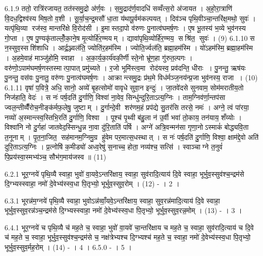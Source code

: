 6.1.9
ततो॒ रात्रि॑रजायत॒ तत॑स्समु॒द्रो अ॑र्ण॒वः । स॒मु॒द्राद॑र्ण॒वादधि॑ सव्वँत्स॒रो अ॑जायत । अ॒हो॒रा॒त्राणि॑ वि॒दध॒द्विश्व॑स्य मिष॒तो व॒शी । सू॒र्या॒च॒न्द्र॒मसौ॑ धा॒ता य॑थापू॒र्वम॑कल्पयत् । दिव॑ञ्च पृथि॒वीञ्चा॒न्तरि॑क्ष॒मथो॒ सुवः॑ । यत्पृ॑थि॒व्या रज॑स्व॒ मान्तरि॑क्षे वि॒रोद॑सी । इ॒मास्तदा॒पो व॑रुणः पु॒नात्व॑घमर्\mbox{}ष॒णः । ए॒ष भू॒तस्य॑ भ॒व्ये भुव॑नस्य गो॒प्ता । ए॒ष पु॒ण्यकृ॑ताल्लोँ॒का॒ने॒ष मृ॒त्योर्\mbox{}हि॑र॒ण्मयम् । द्यावा॑पृथि॒व्योर्\mbox{}हि॑र॒ण्मय॒ सश्रि॑त॒ सुवः॑ । (9)
6.1.10
स न॒स्सुव॒स्सशि॑शाधि । आर्द्र॒ञ्ज्वल॑ति॒ ज्योति॑र॒हम॑स्मि । ज्योति॒र्ज्वल॑ति॒ ब्रह्मा॒हम॑स्मि । यो॑ऽहम॑स्मि॒ ब्रह्मा॒हम॑स्मि । अ॒हमे॒वाहं माञ्जु॑होमि॒ स्वाहा । अ॒का॒र्य॒का॒र्य॑वकी॒र्णी स्ते॒नो भ्रू॑ण॒हा गु॑रुत॒ल्पगः । वरु॑णो॒ऽपाम॑घमर्\mbox{}ष॒णस्तस्मात्पा॒पात् प्रमु॑च्यते । र॒जो भूमि॑स्त्व॒मा रोद॑यस्व॒ प्रव॑दन्ति॒ धीराः । पु॒नन्तु॒ ऋष॑यः पु॒नन्तु॒ वस॑वः पु॒नातु॒ वरु॑णः पु॒नात्व॑घमर्\mbox{}ष॒णः । आक्रान्त्समु॒द्रः प्र॑थ॒मे विध॑र्मञ्ज॒नय॑न्प्र॒जा भुव॑नस्य॒ राजा । (10)
6.1.11
वृषा॑ प॒वित्रे॒ अधि॒ सानो॒ अव्ये॑ बृ॒हत्सोमो॑ वावृधे सुवा॒न इन्दुः॑ । जा॒तवे॑दसे सुनवाम॒ सोम॑मरातीय॒तो निज॑हाति॒ वेदः॑ । स नः॑ पर्\mbox{}ष॒दति॑ दु॒र्गाणि॒ विश्वा॑ ना॒वेव॒ सिन्धु॑न्दुरि॒ताऽत्य॒ग्निः । ताम॒ग्निव॑र्णा॒न्तप॑सा ज्वल॒न्तीव्वैँ॑रोच॒नीङ्क॑र्मफ॒लेषु॒ जुष्टाम् । दु॒र्गान्दे॒वी शर॑णम॒हं प्रप॑द्ये सु॒तर॑सि तरसे॒ नमः॑ । अग्ने॒ त्वं पा॑रया॒ नव्यो॑ अ॒स्मान्त्स्व॒स्तिभि॒रति॑ दु॒र्गाणि॒ विश्वा । पूश्च॑ पृ॒थ्वी ब॑हु॒ला न॑ उ॒र्वी भवा॑ तो॒काय॒ तन॑याय॒ शँय्योः । विश्वा॑नि नो दु॒र्गहा॑ जातवेद॒स्सिन्धु॒न्न ना॒वा दु॑रि॒ताति॑ पर्\mbox{}षि । अग्ने॑ अत्रि॒वन्मन॑सा गृणा॒नोऽस्माकं॑ बोद्ध्यवि॒ता त॒नूनाम् । पृ॒त॒ना॒जित॒ सह॑मानम॒ग्निमु॒ग्र हु॑वेम पर॒मात्स॒धस्थात् । स नः॑ पर्\mbox{}ष॒दति॑ दु॒र्गाणि॒ विश्वा॒ क्षाम॑द्दे॒वो अति॑ दुरि॒ताऽत्य॒ग्निः । प्र॒त्नोषि॑ क॒मीड्यो॑ अध्व॒रेषु॑ स॒नाच्च॒ होता॒ नव्य॑श्च॒ सत्सि॑ । स्वाञ्चाग्ने त॒नुवं॑ पि॒प्रय॑स्वा॒स्मभ्य॑ञ्च॒ सौभ॑ग॒माय॑जस्व ॥ (11)
\anuvakamend


6.2.1
भूर॒ग्नये॑ पृथि॒व्यै स्वाहा॒ भुवो॑ वा॒यवे॒ऽन्तरि॑क्षाय॒ स्वाहा॒ सुव॑रादि॒त्याय॑ दि॒वे स्वाहा॒ भूर्भुव॒स्सुव॑श्च॒न्द्रम॑से दि॒ग्भ्यस्स्वाहा॒ नमो॑ दे॒वेभ्य॑स्स्व॒धा पि॒तृभ्यो॒ भूर्भुव॒स्सुव॒रोम् । (12) - । 2 ।
\anuvakamend

6.3.1
भूरन्न॑म॒ग्नये॑ पृथि॒व्यै स्वाहा॒ भुवोऽन्न॑व्वाँ॒यवे॒ऽन्तरि॑क्षाय॒ स्वाहा॒ सुव॒रन्न॑मादि॒त्याय॑ दि॒वे स्वाहा॒ भूर्भुव॒स्सुव॒रन्न॑ञ्च॒न्द्रम॑से दि॒ग्भ्यस्स्वाहा॒ नमो॑ दे॒वेभ्य॑स्स्व॒धा पि॒तृभ्यो॒ भूर्भुव॒स्सुव॒रन्न॒मोम् । (13) - । 3 ।
\anuvakamend

6.4.1
भूर॒ग्नये॑ च पृथि॒व्यै च॑ मह॒ते च॒ स्वाहा॒ भुवो॑ वा॒यवे॑ चा॒न्तरि॑क्षाय च मह॒ते च॒ स्वाहा॒ सुव॑रादि॒त्याय॑ च दि॒वे च॑ मह॒ते च॒ स्वाहा॒ भूर्भुव॒स्सुव॑श्च॒न्द्रम॑से च॒ नक्ष॑त्रेभ्यश्च दि॒ग्भ्यश्च॑ मह॒ते च॒ स्वाहा॒ नमो॑ दे॒वेभ्य॑स्स्व॒धा पि॒तृभ्यो॒ भूर्भुव॒स्सुव॒र्मह॒रोम् । (14) - । 4 ।
6.5.0
- । 5 ।
\anuvakamend

